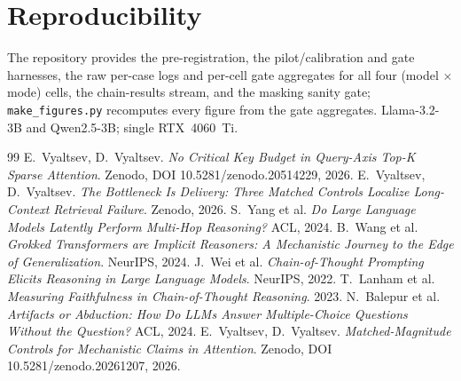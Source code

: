 \documentclass[11pt]{article}
\begin{document}
\section*{Reproducibility}
The repository provides the pre-registration, the pilot/calibration and gate harnesses,
the raw per-case logs and per-cell gate aggregates for all four (model $\times$ mode)
cells, the chain-results stream, and the masking sanity gate; \texttt{make\_figures.py}
recomputes every figure from the gate aggregates. Llama-3.2-3B and Qwen2.5-3B; single
RTX~4060~Ti.

\begin{thebibliography}{99}
\small
{} E.\ Vyaltsev, D.\ Vyaltsev. \emph{No Critical Key Budget in Query-Axis Top-K Sparse Attention}. Zenodo, DOI 10.5281/zenodo.20514229, 2026.
 E.\ Vyaltsev, D.\ Vyaltsev. \emph{The Bottleneck Is Delivery: Three Matched Controls Localize Long-Context Retrieval Failure}. Zenodo, 2026.
 S.\ Yang et al. \emph{Do Large Language Models Latently Perform Multi-Hop Reasoning?} ACL, 2024.
 B.\ Wang et al. \emph{Grokked Transformers are Implicit Reasoners: A Mechanistic Journey to the Edge of Generalization}. NeurIPS, 2024.
 J.\ Wei et al. \emph{Chain-of-Thought Prompting Elicits Reasoning in Large Language Models}. NeurIPS, 2022.
 T.\ Lanham et al. \emph{Measuring Faithfulness in Chain-of-Thought Reasoning}. 2023.
 N.\ Balepur et al. \emph{Artifacts or Abduction: How Do LLMs Answer Multiple-Choice Questions Without the Question?} ACL, 2024.
 E.\ Vyaltsev, D.\ Vyaltsev. \emph{Matched-Magnitude Controls for Mechanistic Claims in Attention}. Zenodo, DOI 10.5281/zenodo.20261207, 2026.
\end{thebibliography}
\end{document}
